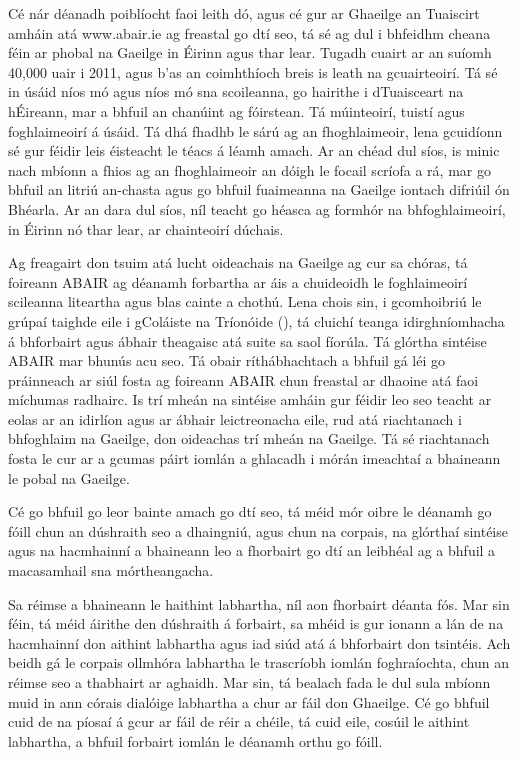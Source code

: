 \begin{multicols}{2}
Cé nár déanadh poiblíocht faoi leith dó, agus cé gur ar Ghaeilge an Tuaiscirt amháin atá www.abair.ie ag freastal go dtí seo, tá sé ag dul i bhfeidhm cheana féin ar phobal na Gaeilge in Éirinn agus thar lear. Tugadh cuairt ar an suíomh 40,000 uair i 2011, agus b’as an coimhthíoch breis is leath na gcuairteoirí. Tá sé in úsáid níos mó agus níos mó sna scoileanna, go hairithe i dTuaisceart na hÉireann, mar a bhfuil an chanúint ag fóirstean. Tá múinteoirí, tuistí agus foghlaimeoirí á úsáid. Tá dhá fhadhb le sárú ag an fhoghlaimeoir, lena gcuidíonn sé gur féidir leis éisteacht le téacs á léamh amach. Ar an chéad dul síos, is minic nach mbíonn a fhios ag an fhoghlaimeoir an dóigh le focail scríofa a rá, mar go bhfuil an litriú an-chasta agus go bhfuil fuaimeanna na Gaeilge iontach difriúil ón Bhéarla. Ar an dara dul síos, níl teacht go héasca ag formhór na bhfoghlaimeoirí, in Éirinn nó thar lear, ar chainteoirí dúchais.

Ag freagairt don tsuim atá lucht oideachais na Gaeilge ag cur sa chóras, tá foireann ABAIR ag déanamh forbartha ar áis a chuideoidh le foghlaimeoirí scileanna liteartha agus blas cainte a chothú. Lena chois sin, i gcomhoibriú le grúpaí taighde eile i gColáiste na Tríonóide (\cite {slate2011}), tá cluichí teanga idirghníomhacha á bhforbairt agus ábhair theagaisc atá suite sa saol fíorúla. Tá glórtha sintéise ABAIR mar bhunús acu seo. Tá obair ríthábhachtach a bhfuil gá léi go práinneach ar siúl fosta ag foireann ABAIR chun freastal ar dhaoine atá faoi míchumas radhairc. Is trí mheán na sintéise amháin gur féidir leo seo teacht ar eolas ar an idirlíon agus ar ábhair leictreonacha eile, rud atá riachtanach i bhfoghlaim na Gaeilge, don oideachas trí mheán na Gaeilge. Tá sé riachtanach fosta le cur ar a gcumas páirt iomlán a ghlacadh i mórán imeachtaí a bhaineann le pobal na Gaeilge.

Cé go bhfuil go leor bainte amach go dtí seo, tá méid mór oibre le déanamh go fóill chun an dúshraith seo a dhaingniú, agus chun na corpais, na glórthaí sintéise agus na hacmhainní a bhaineann leo a fhorbairt go dtí an leibhéal ag a bhfuil a macasamhail sna mórtheangacha.     

Sa réimse a bhaineann le haithint labhartha, níl aon fhorbairt déanta fós. Mar sin féin, tá méid áirithe den dúshraith á forbairt, sa mhéid is gur ionann a lán de na hacmhainní don aithint labhartha agus iad siúd atá á bhforbairt don tsintéis. Ach beidh gá le corpais ollmhóra labhartha le trascríobh iomlán foghraíochta, chun an réimse seo a thabhairt ar aghaidh. Mar sin, tá bealach fada le dul sula mbíonn muid in ann córais dialóige labhartha a chur ar fáil don Ghaeilge. Cé go bhfuil cuid de na píosaí á gcur ar fáil de réir a chéile, tá cuid eile, cosúil le aithint labhartha, a bhfuil forbairt iomlán le déanamh orthu go fóill.



\end{multicols}
